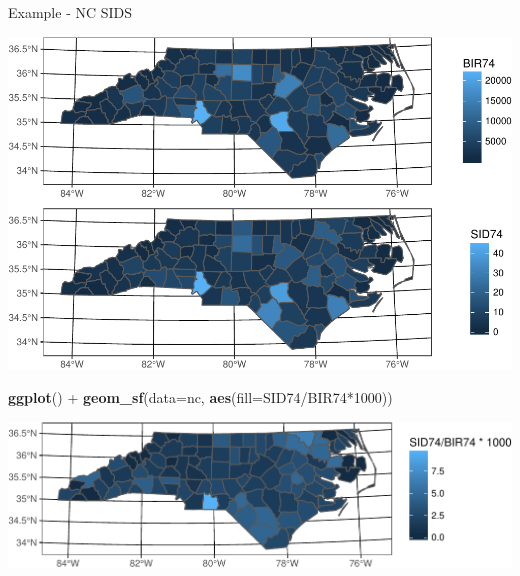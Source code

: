 \documentclass[11pt,ignorenonframetext,]{beamer}
\newenvironment{Shaded}{}{}
\newcommand{\DataTypeTok}[1]{\textcolor[rgb]{0.56,0.13,0.00}{#1}}
\newcommand{\DecValTok}[1]{\textcolor[rgb]{0.25,0.63,0.44}{#1}}
\newcommand{\KeywordTok}[1]{\textcolor[rgb]{0.00,0.44,0.13}{\textbf{#1}}}
\newcommand{\NormalTok}[1]{#1}
\newcommand{\OperatorTok}[1]{\textcolor[rgb]{0.40,0.40,0.40}{#1}}
\newcommand{\StringTok}[1]{\textcolor[rgb]{0.25,0.44,0.63}{#1}}
\let\oldShaded\Shaded
\let\endoldShaded\endShaded
\renewenvironment{Shaded}{\footnotesize\begin{spacing}{0.9}\oldShaded}{\endoldShaded\end{spacing}}
\begin{document}
\begin{frame}{Example - NC SIDS}
\protect\hypertarget{example---nc-sids}{}

\begin{center}\includegraphics[width=\textwidth]{Lec18_files/figure-beamer/unnamed-chunk-6-1} \end{center}

\end{frame}

\begin{frame}[fragile]{}
\protect\hypertarget{section-2}{}

\begin{Shaded}
\begin{Highlighting}[]
\KeywordTok{ggplot}\NormalTok{() }\OperatorTok{+}\StringTok{ }\KeywordTok{geom_sf}\NormalTok{(}\DataTypeTok{data=}\NormalTok{nc, }\KeywordTok{aes}\NormalTok{(}\DataTypeTok{fill=}\NormalTok{SID74}\OperatorTok{/}\NormalTok{BIR74}\OperatorTok{*}\DecValTok{1000}\NormalTok{))}
\end{Highlighting}
\end{Shaded}

\begin{center}\includegraphics[width=\textwidth]{Lec18_files/figure-beamer/unnamed-chunk-7-1} \end{center}

\end{frame}
\end{document}
